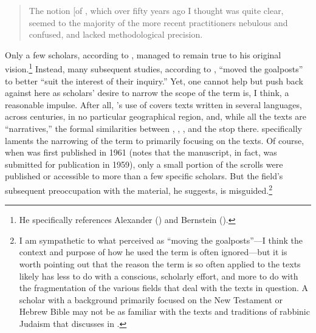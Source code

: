 \begin{quote}
The notion {[}of \rwb{]}, which over fifty years ago I
thought was quite clear, seemed to the majority of the more recent
practitioners nebulous and confused, and lacked methodological
precision.\autocite[3]{vermes_zsengeller2014}
\end{quote}

Only a few scholars, according to \vermes, managed to
remain true to his original vision.\footnote{He specifically references
  Alexander (\autocite*{alexander_carson-williamson1988}) and Bernstein
  (\autocite*{bernstein_textus2005}).} Instead, many subsequent studies,
according to \vermes, ``moved the goalposts'' to better
``suit the interest of their
inquiry.''\autocite[4]{vermes_zsengeller2014} Yet, one cannot help but
push back against \vermes here as scholars' desire to
narrow the scope of the term is, I think, a reasonable impulse. After
all, \vermes's use of \rwb covers texts
written in several languages, across centuries, in no particular
geographical region, and, while all the texts are ``narratives,'' the
formal similarities between \ga, \ant,
\jub, and the \pTarg stop there.
\vermes specifically laments the narrowing of the term
\rwb to primarily focusing on the \dss
texts. Of course, when  was first published in 1961
(\vermes notes that the manuscript, in fact, was
submitted for publication in 1959), only a small portion of the scrolls
were published or accessible to more than a few specific scholars. But
the field's subsequent preoccupation with the \qumran
material, he suggests, is misguided.\footnote{I am sympathetic to what
  \vermes perceived as ``moving the goalposts''---I
  think the context and purpose of how he used the term
  \rwb is often ignored---but it is worth pointing out
  that the reason the term \rwb is so often applied to
  the \qumran texts likely has less to do with a
  conscious, scholarly effort, and more to do with the fragmentation of
  the various fields that deal with the texts in question. A scholar
  with a background primarily focused on the New Testament or Hebrew
  Bible may not be as familiar with the texts and traditions of rabbinic
  Judaism that \vermes discusses in
  .}

